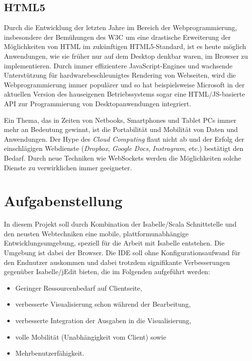 \subsection{HTML5}

Durch die Entwicklung der letzten Jahre im Bereich der Webprogrammierung, insbesondere der
Bemühungen des W3C um eine drastische Erweiterung der Möglichkeiten von HTML im zukünftigen
HTML5-Standard, ist es heute möglich Anwendungen, wie sie früher nur auf dem Desktop denkbar waren,
im Browser zu implementieren. Durch immer effizientere JavaScript-Engines und wachsende
Unterstützung für hardwarebeschleunigtes Rendering von Webseiten, wird die Webprogrammierung immer
populärer und so hat beispielsweise Microsoft in der aktuellen Version des hauseigenen
Betriebssystems sogar eine HTML/JS-basierte API zur Programmierung von Desktopanwendungen
integriert.

Ein Thema, das in Zeiten von Netbooks, Smartphones und Tablet PCs immer mehr an Bedeutung gewinnt,
ist die Portabilität und Mobilität von Daten und Anwendungen. Der Hype des \textit{Cloud Computing}
flaut nicht ab und der Erfolg der einschlägigen Webdienste (\textit{Dropbox}, \textit{Google Docs},
\textit{Instragram}, etc.) bestätigt den Bedarf. Durch neue Techniken wie WebSockets werden die
Möglichkeiten solche Dienste zu verwirklichen immer geeigneter.

\section{Aufgabenstellung}

In diesem Projekt soll durch Kombination der Isabelle/Scala Schnittstelle und den neusten
Webtechniken eine mobile, plattformunabhängige Entwicklungsumgebung, speziell für die Arbeit mit
Isabelle entstehen. Die Umgebung ist dabei der Browser. Die IDE soll ohne Konfigurationsaufwand für
den Endnutzer auskommen und dabei trotzdem signifikante Verbesserungen gegenüber Isabelle/jEdit
bieten, die im Folgenden aufgeführt werden:

\begin{itemize}
  \item Geringer Ressourcenbedarf auf Clientseite,
  \item verbesserte Visualisierung schon während der Bearbeitung,
  \item verbesserte Integration der Ausgaben in die Visualisierung,
  \item volle Mobilität (Unabhängigkeit vom Client) sowie
  \item Mehrbenutzerfähigkeit.
\end{itemize}

